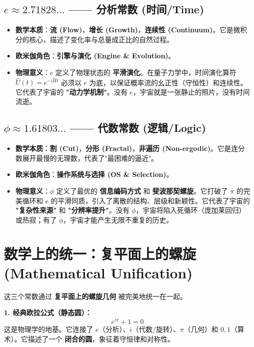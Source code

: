 \subsection{$e \approx 2.71828...$ —— 分析常数 (时间/Time)}

\begin{itemize}
\item \textbf{数学本质}：\textbf{流 (Flow)}，\textbf{增长 (Growth)}，\textbf{连续性 (Continuum)}。它是微积分的核心，描述了变化率与总量成正比的自然过程。
\item \textbf{欧米伽角色}：\textbf{引擎与演化 (Engine \& Evolution)}。
\item \textbf{物理意义}：$e$ 定义了物理状态的 \textbf{平滑演化}。在量子力学中，时间演化算符 $\hat{U}(t) = e^{-i\hat{H}t}$ 必须以 $e$ 为底，以保证概率流的幺正性（守恒性）和连续性。它代表了宇宙的 \textbf{"动力学机制"}。没有 $e$，宇宙就是一张静止的照片，没有时间流逝。
\end{itemize}

\subsection{$\phi \approx 1.61803...$ —— 代数常数 (逻辑/Logic)}

\begin{itemize}
\item \textbf{数学本质}：\textbf{割 (Cut)}，\textbf{分形 (Fractal)}，\textbf{非遍历 (Non-ergodic)}。它是连分数展开最慢的无理数，代表了"最困难的逼近"。
\item \textbf{欧米伽角色}：\textbf{操作系统与选择 (OS \& Selection)}。
\item \textbf{物理意义}：$\phi$ 定义了最优的 \textbf{信息编码方式} 和 \textbf{斐波那契螺旋}。它打破了 $\pi$ 的完美循环和 $e$ 的平滑同质，引入了离散的结构、层级和新颖性。它代表了宇宙的 \textbf{"复杂性来源"} 和 \textbf{"分辨率提升"}。没有 $\phi$，宇宙将陷入死循环（庞加莱回归）或热寂；有了 $\phi$，宇宙才能产生无限不重复的历史。
\end{itemize}

\section{数学上的统一：复平面上的螺旋 (Mathematical Unification)}

这三个常数通过 \textbf{复平面上的螺旋几何} 被完美地统一在一起。

\textbf{1. 经典欧拉公式（静态圆）：}
\[e^{i\pi} + 1 = 0\]
这是物理学的地基。它连接了 $e$（分析）、$i$（代数/旋转）、$\pi$（几何）和 $0, 1$（算术）。它描述了一个 \textbf{闭合的圆}，象征着守恒律和对称性。

